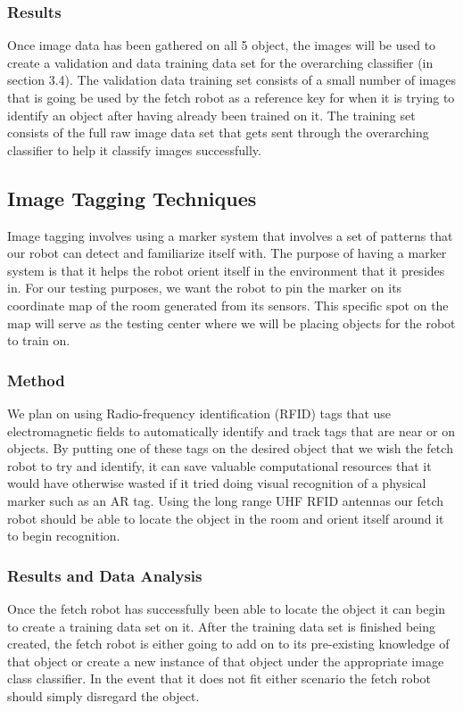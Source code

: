 \documentclass[draftclsnofoot, onecolumn, 10pt, compsoc]{IEEEtran}
\begin{document}
\subsubsection{Results}
Once image data has been gathered on all 5 object, the images will be used to create a validation and data training data set for the overarching classifier (in section 3.4). The validation data training set consists of a small number of images that is going be used by the fetch robot as a reference key for when it is trying to identify an object after having already been trained on it. The training set consists of the full raw image data set that gets sent through the overarching classifier to help it classify images successfully.

\subsection{Image Tagging Techniques}
Image tagging involves using a marker system that involves a set of patterns that our robot can detect and familiarize itself with. The purpose of having a marker system is that it helps the robot orient itself in the environment that it presides in. For our testing purposes, we want the robot to pin the marker on its coordinate map of the room generated from its sensors. This specific spot on the map will serve as the testing center where we will be placing objects for the robot to train on.

\subsubsection{Method}
We plan on using Radio-frequency identification (RFID) tags that use electromagnetic fields to automatically identify and track tags that are near or on objects. By putting one of these tags on the desired object that we wish the fetch robot to try and identify, it can save valuable computational resources that it would have otherwise wasted if it tried doing visual recognition of a physical marker such as an AR tag. Using the long range UHF RFID antennas our fetch robot should be able to locate the object in the room and orient itself around it to begin recognition. 

\subsubsection{Results and Data Analysis}
Once the fetch robot has successfully been able to locate the object it can begin to create a training data set on it. After the training data set is finished being created, the fetch robot is either going to add on to its pre-existing knowledge of that object or create a new instance of that object under the appropriate image class classifier. In the event that it does not fit either scenario the fetch robot should simply disregard the object. 
\end{document}
